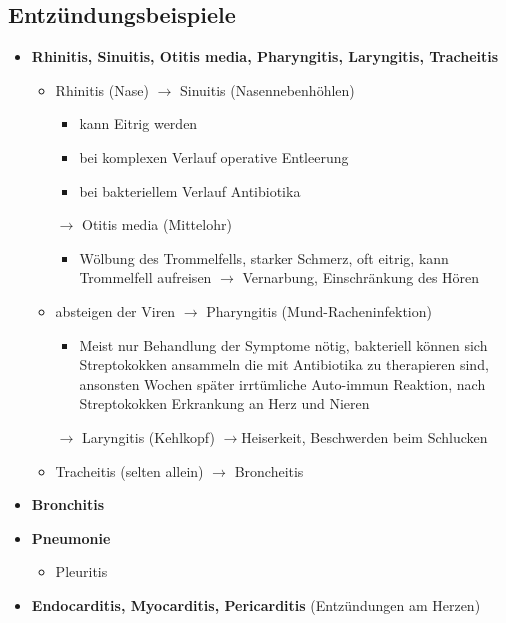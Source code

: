 \begin{itemize}
	\subsection{Entzündungsbeispiele}
		\begin{itemize}
			\item \textbf{Rhinitis, Sinuitis, Otitis media, Pharyngitis, Laryngitis, Tracheitis}
				\begin{itemize}
					\item Rhinitis (Nase) $\rightarrow$ Sinuitis (Nasennebenhöhlen)
						\begin{itemize}
							\item kann Eitrig werden
							\item bei komplexen Verlauf operative Entleerung
							\item bei bakteriellem Verlauf Antibiotika
						\end{itemize}
					\item[$\rightarrow$] Otitis media (Mittelohr)
						\begin{itemize}
						 	\item Wölbung des Trommelfells, starker Schmerz, oft eitrig, kann Trommelfell aufreisen $\rightarrow$ Vernarbung, Einschränkung des Hören
						 \end{itemize}
					\item absteigen der Viren $\rightarrow$ Pharyngitis (Mund-Racheninfektion)
						\begin{itemize}
							\item Meist nur Behandlung der Symptome nötig, bakteriell können sich Streptokokken ansammeln die mit Antibiotika zu therapieren sind, ansonsten Wochen später irrtümliche Auto-immun Reaktion, nach Streptokokken Erkrankung an Herz und Nieren
						\end{itemize}
					\item[$\rightarrow$] Laryngitis (Kehlkopf) $\rightarrow $Heiserkeit, Beschwerden beim Schlucken
					\item Tracheitis (selten allein) $\rightarrow$ Broncheitis
				\end{itemize}
			\item \textbf{Bronchitis}
			\item \textbf{Pneumonie}
				\begin{itemize}
					\item Pleuritis
				\end{itemize}
			\item \textbf{Endocarditis, Myocarditis, Pericarditis} (Entzündungen am Herzen)

\end{itemize}
\end{itemize}
